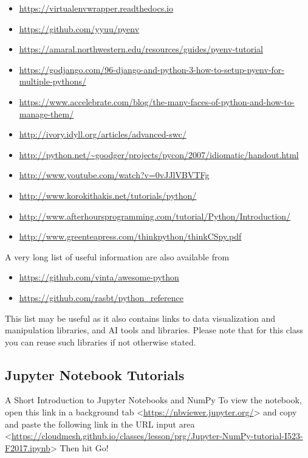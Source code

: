 \begin{itemize}

\item
  \url{https://virtualenvwrapper.readthedocs.io}
\item
  \url{https://github.com/yyuu/pyenv}
\item
  \url{https://amaral.northwestern.edu/resources/guides/pyenv-tutorial}
\item
  \url{https://godjango.com/96-django-and-python-3-how-to-setup-pyenv-for-multiple-pythons/}
\item
  \url{https://www.accelebrate.com/blog/the-many-faces-of-python-and-how-to-manage-them/}
\item
  \url{http://ivory.idyll.org/articles/advanced-swc/}
\item
  \url{http://python.net/~goodger/projects/pycon/2007/idiomatic/handout.html}
\item
  \url{http://www.youtube.com/watch?v=0vJJlVBVTFg}
\item
  \url{http://www.korokithakis.net/tutorials/python/}
\item
  \url{http://www.afterhoursprogramming.com/tutorial/Python/Introduction/}
\item
  \url{http://www.greenteapress.com/thinkpython/thinkCSpy.pdf}
\end{itemize}

A very long list of useful information are also available from

\begin{itemize}

\item
  \url{https://github.com/vinta/awesome-python}
\item
  \url{https://github.com/rasbt/python_reference}
\end{itemize}

This list may be useful as it also contains links to data visualization
and manipulation libraries, and AI tools and libraries. Please note that
for this class you can reuse such libraries if not otherwise stated.

\subsection{Jupyter Notebook
Tutorials}\label{jupyter-notebook-tutorials}

A Short Introduction to Jupyter Notebooks and NumPy To view the
notebook, open this link in a background tab
\textless{}\url{https://nbviewer.jupyter.org/}\textgreater{} and copy
and paste the following link in the URL input area
\textless{}\url{https://cloudmesh.github.io/classes/lesson/prg/Jupyter-NumPy-tutorial-I523-F2017.ipynb}\textgreater{}
Then hit Go!

